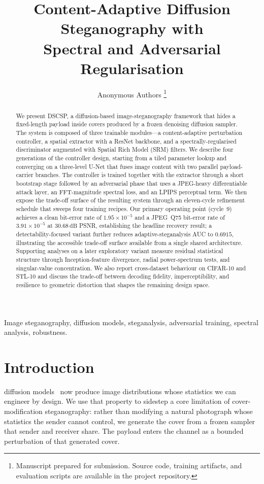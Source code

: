\documentclass[journal]{IEEEtran}
\title{Content-Adaptive Diffusion Steganography with\\
Spectral and Adversarial Regularisation}
\author{Anonymous Authors%
\thanks{Manuscript prepared for submission. Source code, training
artifacts, and evaluation scripts are available in the project
repository.}}
\begin{document}
\maketitle

\begin{abstract}
We present DSCSP, a diffusion-based image-steganography framework that
hides a fixed-length payload inside covers produced by a frozen
denoising diffusion sampler. The system is composed of three trainable
modules---a content-adaptive perturbation controller, a spatial
extractor with a ResNet backbone, and a spectrally-regularised
discriminator augmented with Spatial Rich Model (SRM) filters. We
describe four generations of the controller design, starting from a
tiled parameter lookup and converging on a three-level U-Net that
fuses image content with two parallel payload-carrier branches. The
controller is trained together with the extractor through a short
bootstrap stage followed by an adversarial phase that uses a
JPEG-heavy differentiable attack layer, an FFT-magnitude spectral
loss, and an LPIPS perceptual term. We then expose the trade-off
surface of the resulting system through an eleven-cycle refinement
schedule that sweeps four training recipes. Our primary operating point (cycle~9) achieves a clean bit-error rate
of $1.95\!\times\!10^{-5}$ and a JPEG~Q75 bit-error rate of
$3.91\!\times\!10^{-5}$ at $30.68\,\mathrm{dB}$ PSNR, establishing
the headline recovery result; a detectability-focused variant further
reduces adaptive-steganalysis AUC to $0.6915$, illustrating the
accessible trade-off surface available from a single shared
architecture. Supporting
analyses on a later exploratory variant measure residual statistical
structure through Inception-feature divergence, radial power-spectrum
tests, and singular-value concentration. We also report
cross-dataset behaviour on CIFAR-10 and STL-10 and discuss the
trade-off between decoding fidelity, imperceptibility, and
resilience to geometric distortion that shapes the remaining design
space.
\end{abstract}

\begin{IEEEkeywords}
Image steganography, diffusion models, steganalysis, adversarial
training, spectral analysis, robustness.
\end{IEEEkeywords}

\section{Introduction}
 diffusion models~\cite{ho2020denoising,
song2020denoising} now produce image distributions whose statistics
we can engineer by design. We use that property to sidestep a core
limitation of cover-modification steganography: rather than modifying
a natural photograph whose statistics the sender cannot control, we
generate the cover from a frozen sampler that sender and receiver
share. The payload enters the channel as a bounded perturbation of
that generated cover.
\end{document}
